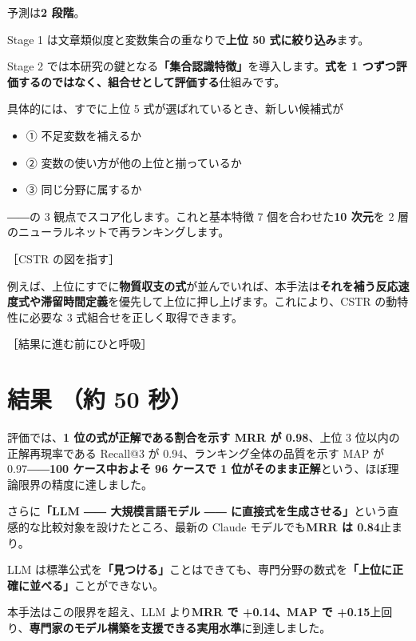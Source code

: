 \documentclass[a5paper,11pt]{ltjsarticle}
\begin{document}
予測は\textbf{2 段階}。

Stage 1 は文章類似度と変数集合の重なりで\textbf{上位 50 式に絞り込み}ます。

Stage 2 では本研究の鍵となる\textbf{「集合認識特徴」}を導入します。\textbf{式を 1 つずつ評価するのではなく、組合せとして評価する}仕組みです。

具体的には、すでに上位 5 式が選ばれているとき、新しい候補式が

\begin{itemize}[leftmargin=1.5em,itemsep=0pt,topsep=0.2em]
\item ① 不足変数を補えるか
\item ② 変数の使い方が他の上位と揃っているか
\item ③ 同じ分野に属するか
\end{itemize}

――の 3 観点でスコア化します。これと基本特徴 7 個を合わせた\textbf{10 次元}を 2 層のニューラルネットで再ランキングします。

\begin{memo}\small ［CSTR の図を指す］\end{memo}

例えば、上位にすでに\textbf{物質収支の式}が並んでいれば、本手法は\textbf{それを補う反応速度式や滞留時間定義}を優先して上位に押し上げます。これにより、CSTR の動特性に必要な 3 式組合せを正しく取得できます。

\begin{memo}\small ［結果に進む前にひと呼吸］\end{memo}

\section*{結果 \normalfont\small（約 50 秒）}

評価では、\textbf{1 位の式が正解である割合を示す MRR が 0.98}、上位 3 位以内の正解再現率である Recall@3 が 0.94、ランキング全体の品質を示す MAP が 0.97――\textbf{100 ケース中およそ 96 ケースで 1 位がそのまま正解}という、ほぼ理論限界の精度に達しました。

さらに\textbf{「LLM ―― 大規模言語モデル ―― に直接式を生成させる」}という直感的な比較対象を設けたところ、最新の Claude モデルでも\textbf{MRR は 0.84}止まり。

LLM は標準公式を\textbf{「見つける」}ことはできても、専門分野の数式を\textbf{「上位に正確に並べる」}ことができない。

本手法はこの限界を超え、LLM より\textbf{MRR で +0.14、MAP で +0.15}上回り、\textbf{専門家のモデル構築を支援できる実用水準}に到達しました。
\end{document}
